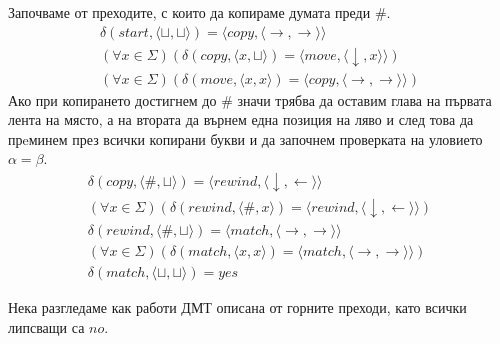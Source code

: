 \documentclass[14pt]{extarticle}
\begin{document}
Започваме от преходите, с които да копираме думата преди \(\#\).
\begin{align*}
    \delta(start, \langle \sqcup, \sqcup \rangle) = \langle copy, \langle \rightarrow, \rightarrow \rangle \rangle \\
    (\forall x \in \Sigma)(\delta(copy, \langle x, \sqcup \rangle) = \langle move, \langle \downarrow, x \rangle \rangle)\\
    (\forall x \in \Sigma)(\delta(move, \langle x, x \rangle) = \langle copy, \langle \rightarrow, \rightarrow \rangle \rangle)
\end{align*}
Ако при копирането достигнем до \(\#\) значи трябва да оставим глава на първата лента на място,
а на втората да върнем една позиция на ляво и след това
да прeминем през всички копирани букви и да започнем проверката на уловието \(\alpha = \beta\).
\begin{align*}
    \delta(copy, \langle \#, \sqcup \rangle) = \langle rewind, \langle \downarrow, \leftarrow \rangle \rangle \\
    (\forall x \in \Sigma)(\delta(rewind, \langle \#, x \rangle) = \langle rewind, \langle \downarrow, \leftarrow \rangle \rangle)\\
    \delta(rewind, \langle \#, \sqcup \rangle) = \langle match, \langle \rightarrow, \rightarrow \rangle \rangle \\
    (\forall x \in \Sigma)(\delta(match, \langle x, x \rangle) = \langle match, \langle \rightarrow, \rightarrow \rangle \rangle)\\
    \delta(match, \langle \sqcup, \sqcup \rangle) = yes
\end{align*}

Нека разгледаме как работи ДМТ описана от горните преходи, като всички липсващи са \(no\).
\end{document}
